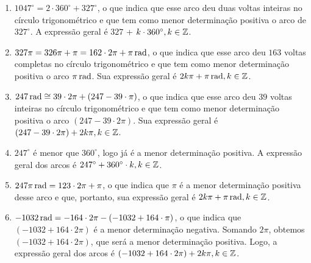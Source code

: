 \documentclass[10 pt,usenames,dvipsnames, oneside]{article}
\begin{document}
\ifdefined\prof
\begin{solucao}

\begin{enumerate}
\item $1047^{\circ} = 2\cdot360^{\circ} + 327^{\circ}$, o que indica que esse arco deu duas voltas inteiras no círculo trigonométrico e que tem como menor determinação positiva  o arco de $327^{\circ}$. A expressão geral é $327$ + $k\cdot360^{\circ}, k\in \mathbb{Z}$.

\item $327\pi=326\pi+\pi=162\cdot2\pi+\pi\operatorname{rad}$, o que indica que esse arco deu $163$ voltas completas no círculo trigonométrico e que tem como menor determinação positiva o arco $\pi\operatorname{rad}$. Sua expressão geral é $2k\pi+\pi\operatorname{rad}, k\in\mathbb{Z}$.
\item $247\operatorname{rad}\cong39\cdot2\pi+(247-39\cdot\pi)$, o que indica que esse arco deu $39$ voltas inteiras no círculo trigonométrico e que tem como menor determinação positiva o arco $(247-39\cdot2\pi)$. Sua expressão geral é $(247-39\cdot2\pi)+2k\pi, k\in\mathbb{Z}$.
\item $247^{\circ}$ é menor que $360^{\circ}$, logo já é a menor determinação positiva. A expressão geral dos arcos é $247^{\circ}+360^{\circ}\cdot k, k\in\mathbb{Z}$.
\item $247\pi\operatorname{rad}=123\cdot2\pi+\pi$, o que indica que $\pi$ é a menor determinação positiva desse arco e que, portanto, sua expressão geral é $2k\pi+\pi\operatorname{rad},k \in\mathbb{Z}$.
\item $-1032\operatorname{rad}=-164\cdot2\pi-(-1032+164\cdot\pi)$, o que indica que $(-1032+164\cdot2\pi)$ é a menor determinação negativa. Somando $2\pi$, obtemos $(-1032+164\cdot2\pi)$, que será a menor determinação positiva. Logo, a expressão geral dos arcos é $(-1032+164\cdot2\pi)+2k\pi,k\in\mathbb{Z}$.
\end{enumerate}

\end{solucao}
\fi
\end{document}
